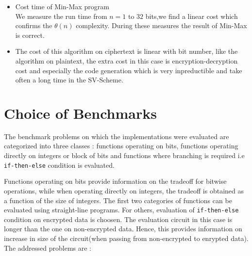 \documentclass{acm_proc_article-sp}
\begin{document}
\begin{itemize}
\item {Cost time of Min-Max program}\\
We measure the run time from $n=1$ to $32$ bits,we find a linear cost which confirms the $\theta(n)$ complexity. During these measures the result of Min-Max is correct.

\item The cost of this algorithm on ciphertext is linear with bit number, like  the algorithm on plaintext, the extra cost in this case is encryption-decryption cost and especially the code generation which is very inpreductible and take often a long time in the SV-Scheme.
\end{itemize}
\section{Choice of Benchmarks}
\label{sec:bm}

The benchmark problems on which the implementations were evaluated are categorized into three classes : functions operating on bits, functions operating directly on integers or block of bits and functions where branching is required i.e \texttt{if-then-else} condition is evaluated. 

Functions operating on bits provide information on the tradeoff for bitwise operations, while when operating directly on integers, the tradeoff is obtained as a function of the size of integers. The first two categories of functions can be evaluated using straight-line programs. For others, evaluation of \texttt{if-then-else} condition on encrypted data is choosen.  The evaluation circuit in this case is longer than the one on non-encrypted data. Hence, this provides information on increase in size of the circuit(when passing from non-encrypted to enrypted data). The addressed problems are : 
\end{document}

